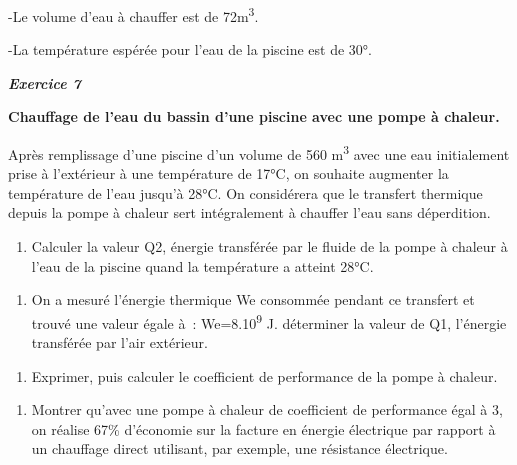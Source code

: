 -Le volume d'eau à chauffer est de 72m\textsuperscript{3}.

-La température espérée pour l'eau de la piscine est de 30°.

\emph{\textbf{Exercice 7}}

\textbf{Chauffage de l'eau du bassin d'une piscine avec une pompe à
chaleur.}

Après remplissage d'une piscine d'un volume de 560 m\textsuperscript{3}
avec une eau initialement prise à l'extérieur à une température de 17°C,
on souhaite augmenter la température de l'eau jusqu'à 28°C. On
considérera que le transfert thermique depuis la pompe à chaleur sert
intégralement à chauffer l'eau sans déperdition.

\begin{enumerate}
\def\labelenumi{\arabic{enumi})}
\tightlist
\item
  Calculer la valeur Q2, énergie transférée par le fluide de la pompe à
  chaleur à l'eau de la piscine quand la température a atteint 28°C.
\end{enumerate}

\begin{enumerate}
\def\labelenumi{\arabic{enumi})}
\tightlist
\item
  On a mesuré l'énergie thermique We consommée pendant ce transfert et
  trouvé une valeur égale à~: We=8.10\textsuperscript{9} J. déterminer
  la valeur de Q1, l'énergie transférée par l'air extérieur.
\end{enumerate}

\begin{enumerate}
\def\labelenumi{\arabic{enumi})}
\tightlist
\item
  Exprimer, puis calculer le coefficient de performance de la pompe à
  chaleur.
\end{enumerate}

\begin{enumerate}
\def\labelenumi{\arabic{enumi})}
\tightlist
\item
  Montrer qu'avec une pompe à chaleur de coefficient de performance égal
  à 3, on réalise 67\% d'économie sur la facture en énergie électrique
  par rapport à un chauffage direct utilisant, par exemple, une
  résistance électrique.
\end{enumerate}

